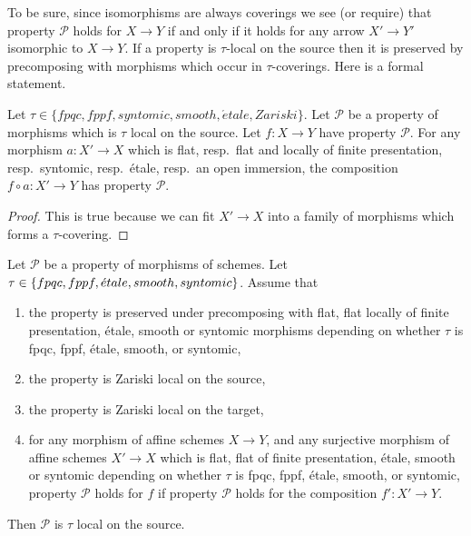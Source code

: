 \noindent
To be sure, since isomorphisms are always coverings
we see (or require) that property $\mathcal{P}$ holds for $X \to Y$
if and only if it holds for any arrow $X' \to Y'$ isomorphic to $X \to Y$.
If a property is $\tau$-local on the source then it is preserved by
precomposing with morphisms which occur in $\tau$-coverings. Here
is a formal statement.

\begin{lemma}
\label{lemma-precompose-property-local-source}
Let $\tau \in \{fpqc, fppf, syntomic, smooth, \acute{e}tale, Zariski\}$.
Let $\mathcal{P}$ be a property of morphisms which is $\tau$ local
on the source. Let $f : X \to Y$ have property $\mathcal{P}$.
For any morphism $a : X' \to X$ which is
flat, resp.\ flat and locally of finite presentation, resp.\ syntomic,
resp.\ \'etale, resp.\ an open immersion, the composition
$f \circ a : X' \to Y$ has property $\mathcal{P}$.
\end{lemma}

\begin{proof}
This is true because we can fit $X' \to X$ into a family of
morphisms which forms a $\tau$-covering.
\end{proof}

\begin{lemma}
\label{lemma-properties-morphisms-local-source}
Let $\mathcal{P}$ be a property of morphisms of schemes.
Let $\tau \in \{fpqc,\linebreak[0] fppf,\linebreak[0]
\acute{e}tale,\linebreak[0] smooth,\linebreak[0] syntomic\}$.
Assume that
\begin{enumerate}
\item the property is preserved under precomposing with
flat, flat locally of finite presentation, \'etale, smooth or syntomic morphisms
depending on whether $\tau$ is fpqc, fppf, \'etale, smooth, or syntomic,
\item the property is Zariski local on the source,
\item the property is Zariski local on the target,
\item for any morphism of affine schemes $X \to Y$, and
any surjective morphism of affine schemes $X' \to X$
which is flat, flat of finite presentation,
\'etale, smooth or syntomic depending on whether $\tau$ is
fpqc, fppf, \'etale, smooth, or syntomic, property
$\mathcal{P}$ holds for $f$ if property $\mathcal{P}$
holds for the composition $f' : X' \to Y$.
\end{enumerate}
Then $\mathcal{P}$ is $\tau$ local on the source.
\end{lemma}

